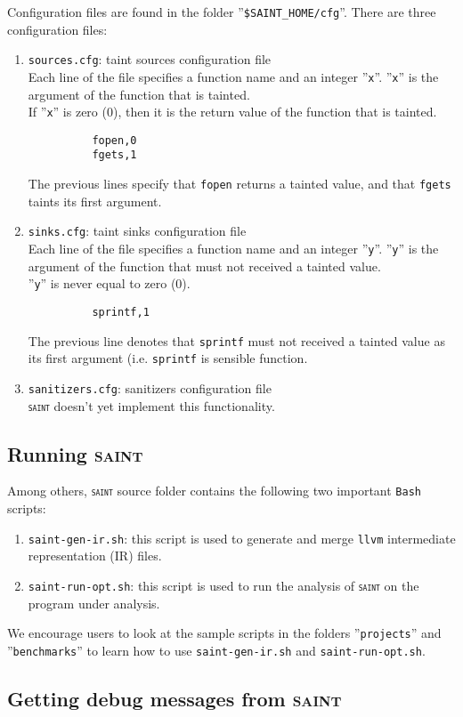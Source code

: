 \documentclass[12pt,onecolumn,a4paper]{article}
\newcommand{\saint}{\texttt{\textsc{saint}}\xspace}
\newcommand{\tool}[1]{\texttt{#1}\xspace}
\begin{document}
Configuration files are found in the folder ''\texttt{\$SAINT\_HOME/cfg}''.
There are three configuration files:
\begin{enumerate}[1)]
	\item \texttt{sources.cfg}: taint sources configuration file\\
		  Each line of the file specifies a function name and an integer ''\texttt{x}''.
		  ''\texttt{x}'' is the argument of the function that is tainted.\\
		  If ''\texttt{x}'' is zero (0), then it is the return value of the function that is tainted.
		  \begin{verbatim}
		  fopen,0
		  fgets,1		  
		  \end{verbatim}
		  The previous lines specify that \texttt{fopen} returns a tainted value, and
		  that \texttt{fgets} taints its first argument. 
	\item \texttt{sinks.cfg}: taint sinks configuration file\\
		  Each line of the file specifies a function name and an integer ''\texttt{y}''.
		  ''\texttt{y}'' is the argument of the function that must not received a tainted value.\\
		  ''\texttt{y}'' is never equal to zero (0).
		  \begin{verbatim}
		  sprintf,1	  
		  \end{verbatim}
		  The previous line denotes that \texttt{sprintf} must not received
		  a tainted value as its first argument (i.e. \texttt{sprintf} is 
		  sensible function.
	\item \texttt{sanitizers.cfg}: sanitizers configuration file\\
		  \saint doesn't yet implement this functionality.
\end{enumerate}

\subsection{Running \textsc{saint}}
Among others, \saint source folder contains the following two important
\texttt{Bash} scripts:
\begin{enumerate}[1)]
	\item \texttt{saint-gen-ir.sh}: this script is used to generate and
		merge \tool{llvm} intermediate representation (IR) files. 
	
	\item \texttt{saint-run-opt.sh}: this script is used to run the analysis of
		\saint on the program under analysis.
\end{enumerate}

We encourage users to look at the sample scripts in the
folders ''\texttt{projects}'' and ''\texttt{benchmarks}''
to learn how to use \texttt{saint-gen-ir.sh} and
\texttt{saint-run-opt.sh}.
		
\subsection{Getting debug messages from \textsc{saint}}		
		



\end{document}
